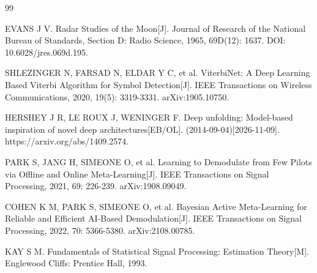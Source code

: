 \begin{thebibliography}{99}

EVANS J V. Radar Studies of the Moon[J]. Journal of Research of the National Bureau of Standards, Section D: Radio Science, 1965, 69D(12): 1637. DOI: 10.6028/jres.069d.195.

SHLEZINGER N, FARSAD N, ELDAR Y C, et al. ViterbiNet: A Deep Learning Based Viterbi Algorithm for Symbol Detection[J]. IEEE Transactions on Wireless Communications, 2020, 19(5): 3319-3331. arXiv:1905.10750.

HERSHEY J R, LE ROUX J, WENINGER F. Deep unfolding: Model-based inspiration of novel deep architectures[EB/OL]. (2014-09-04)[2026-11-09]. https://arxiv.org/abs/1409.2574.

PARK S, JANG H, SIMEONE O, et al. Learning to Demodulate from Few Pilots via Offline and Online Meta-Learning[J]. IEEE Transactions on Signal Processing, 2021, 69: 226-239. arXiv:1908.09049.

COHEN K M, PARK S, SIMEONE O, et al. Bayesian Active Meta-Learning for Reliable and Efficient AI-Based Demodulation[J]. IEEE Transactions on Signal Processing, 2022, 70: 5366-5380. arXiv:2108.00785.

KAY S M. Fundamentals of Statistical Signal Processing: Estimation Theory[M]. Englewood Cliffs: Prentice Hall, 1993.

\end{thebibliography}
